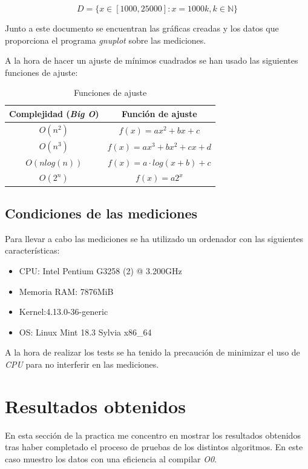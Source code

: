 \documentclass{article}
\begin{document}
$$D = \{x \in [1000, 25000]: x = 1000k, k \in \mathbb{N}\}$$

Junto a este documento se encuentran las gráficas creadas y los datos
que proporciona el programa \textit{gnuplot} sobre las mediciones.

A la hora de hacer un ajuste de mínimos cuadrados se han usado las
siguientes funciones de ajuste:

\begin{table}[H]
  \centering
  \begin{tabular}{|c|c|}
    \hline
    Complejidad (\textit{Big O}) & Función de ajuste \\ \hline
    $O(n^2)$ & $f(x) = ax^2 + bx + c$ \\ \hline
    $O(n^3)$ & $f(x) = ax^3 + bx^2 + cx + d$ \\ \hline
    $O(nlog(n))$ & $f(x) = a\cdot log(x+b) + c$ \\ \hline
    $O(2^n)$ & $f(x) = a2^x$ \\ \hline


  \end{tabular}
  \caption{Funciones de ajuste}
\end{table}

\subsection{Condiciones de las mediciones}

Para llevar a cabo las mediciones se ha utilizado un ordenador con las
siguientes características:

\begin{itemize}
\item CPU: Intel Pentium G3258 (2) @ 3.200GHz
\item Memoria RAM: 7876MiB
\item Kernel:4.13.0-36-generic
\item OS: Linux Mint 18.3 Sylvia x86\_64
\end{itemize}

A la hora de realizar los tests se ha tenido la precaución de
minimizar el uso de \textit{CPU} para no interferir en las mediciones.

\section{Resultados obtenidos}

En esta sección de la practica me concentro en mostrar los resultados
obtenidos tras haber completado el proceso de pruebas de los distintos
algoritmos. En este caso muestro los datos con una eficiencia al
compilar \textit{O0}.
\end{document}
